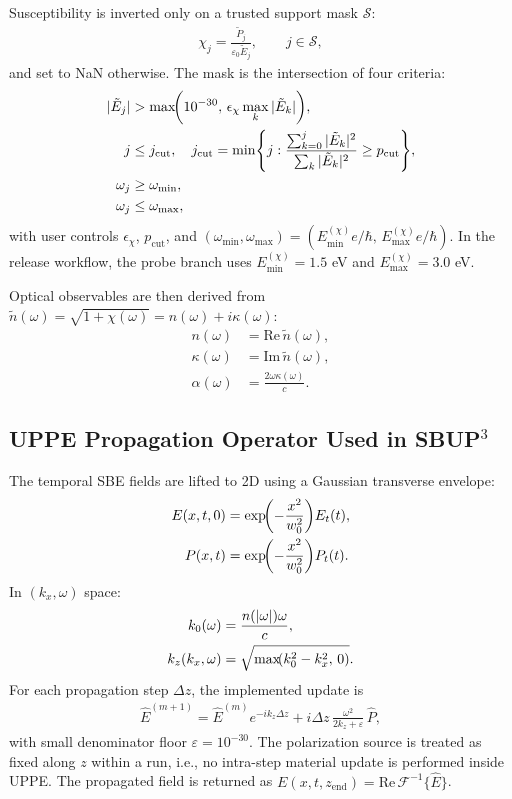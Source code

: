 \documentclass[aps,pra,twocolumn,reprint,superscriptaddress,nofootinbib]{revtex4-2}
\let\originalleft\left
\let\originalright\right
\renewcommand{\left}{\mathopen{}\mathclose\bgroup\originalleft}
\renewcommand{\right}{\aftergroup\egroup\originalright}
\begin{document}
Susceptibility is inverted only on a trusted support mask $\mathcal{S}$:
\begin{align}
\chi_j = \frac{\tilde{P}_j}{\varepsilon_0\tilde{E}_j},
\qquad j\in\mathcal{S},
\end{align}
and set to NaN otherwise. The mask is the intersection of four criteria:
\begin{align}
|\tilde{E}_j| &> \max\!\left(10^{-30},\,\epsilon_{\chi}\max_k|\tilde{E}_k|\right),\\
j &\le j_{\mathrm{cut}}, \quad
j_{\mathrm{cut}}=\min\left\{j:\frac{\sum_{k=0}^j|\tilde{E}_k|^2}{\sum_{k}|\tilde{E}_k|^2}
\ge p_{\mathrm{cut}}\right\},\\
\omega_j &\ge \omega_{\min},\\
\omega_j &\le \omega_{\max},
\end{align}
with user controls $\epsilon_{\chi}$, $p_{\mathrm{cut}}$, and
$(\omega_{\min},\omega_{\max})=(E_{\min}^{(\chi)}e/\hbar,\,
E_{\max}^{(\chi)}e/\hbar)$. In the release workflow, the probe branch uses
$E_{\min}^{(\chi)}=1.5$ eV and $E_{\max}^{(\chi)}=3.0$ eV.

Optical observables are then derived from
$\tilde{n}(\omega)=\sqrt{1+\chi(\omega)}=n(\omega)+i\kappa(\omega)$:
\begin{align}
n(\omega)&=\mathrm{Re}\,\tilde{n}(\omega),\\
\kappa(\omega)&=\mathrm{Im}\,\tilde{n}(\omega),\\
\alpha(\omega)&=\frac{2\omega\kappa(\omega)}{c}.
\end{align}

\subsection{UPPE Propagation Operator Used in SBUP$^3$}
The temporal SBE fields are lifted to 2D using a Gaussian transverse envelope:
\begin{align}
E(x,t,0) &= \exp\!\left(-\frac{x^2}{w_0^2}\right)E_t(t),\\
P(x,t)   &= \exp\!\left(-\frac{x^2}{w_0^2}\right)P_t(t).
\end{align}
In $(k_x,\omega)$ space:
\begin{align}
k_0(\omega) &= \frac{n(|\omega|)\omega}{c},\\
k_z(k_x,\omega) &= \sqrt{\max\!\left(k_0^2-k_x^2,\,0\right)}.
\end{align}
For each propagation step $\Delta z$, the implemented update is
\begin{align}
\hat{E}^{(m+1)}
= \hat{E}^{(m)}e^{-ik_z\Delta z}
+ i\Delta z\,
\frac{\omega^2}{2k_z+\varepsilon}\,\hat{P},
\end{align}
with small denominator floor $\varepsilon=10^{-30}$. The polarization source is
treated as fixed along $z$ within a run, i.e., no intra-step material update is
performed inside UPPE. The propagated field is returned as
$E(x,t,z_{\mathrm{end}})=\mathrm{Re}\,\mathcal{F}^{-1}\{\hat{E}\}$.
\end{document}
